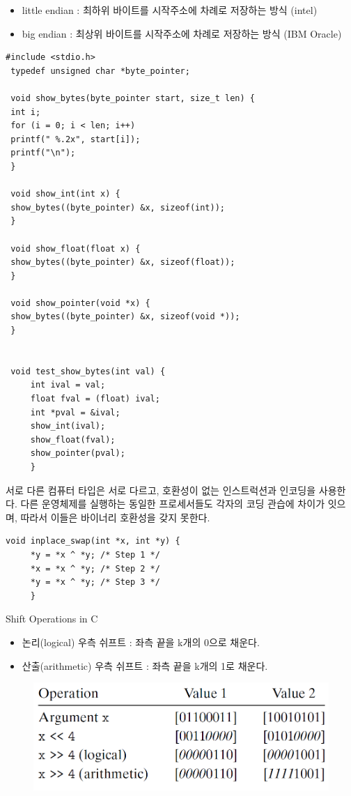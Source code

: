 \documentclass[chapter,oneside]{oblivoir}
\begin{document}
\begin{itemize}
    \item little endian :  최하위 바이트를 시작주소에 차례로 저장하는 방식 (intel)
    \item big endian : 최상위 바이트를 시작주소에 차례로 저장하는 방식 (IBM Oracle)
\end{itemize}


\begin{lstlisting}[style = CStyle]
 #include <stdio.h>
 typedef unsigned char *byte_pointer;

 void show_bytes(byte_pointer start, size_t len) {
 int i;
 for (i = 0; i < len; i++)
 printf(" %.2x", start[i]);
 printf("\n");
 }

 void show_int(int x) {
 show_bytes((byte_pointer) &x, sizeof(int));
 }

 void show_float(float x) {
 show_bytes((byte_pointer) &x, sizeof(float));
 }

 void show_pointer(void *x) {
 show_bytes((byte_pointer) &x, sizeof(void *));
 }


 void test_show_bytes(int val) {
     int ival = val;
     float fval = (float) ival;
     int *pval = &ival;
     show_int(ival);
     show_float(fval);
     show_pointer(pval);
     }

\end{lstlisting}
서로 다른 컴퓨터 타입은 서로 다르고, 호환성이 없는 인스트럭션과 인코딩을 사용한다. 다른 운영체제를 실행하는 동일한 프로세서들도 각자의 코딩 관습에 차이가 잇으며, 따라서 이들은 바이너리 호환성을 갖지 못한다.

\begin{lstlisting}[style = CStyle]
    void inplace_swap(int *x, int *y) {
     *y = *x ^ *y; /* Step 1 */
     *x = *x ^ *y; /* Step 2 */
     *y = *x ^ *y; /* Step 3 */
     }
    \end{lstlisting}
    
    
    Shift Operations in C
    
    \begin{itemize}
        \item  논리(logical) 우측 쉬프트 : 좌측 끝을 k개의 0으로 채운다.
        \item  산출(arithmetic) 우측 쉬프트 : 좌측 끝을 k개의 1로 채운다.
    \end{itemize}
    
    \begin{figure}[h!]
        \centering
        \includegraphics[scale=0.4]{pic/shift}
    \end{figure}
    
\end{document}
